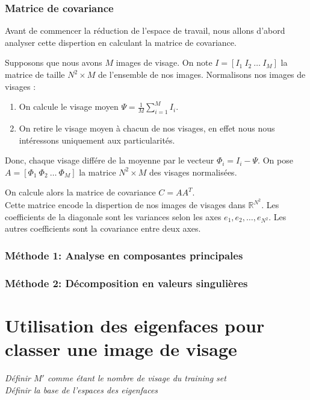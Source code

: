 \documentclass[12pt,french]{article}
\begin{document}
\subsubsection{Matrice de covariance}
Avant de commencer la réduction de l'espace de travail, nous allons d'abord analyser cette dispertion en calculant la matrice de covariance.

Supposons que nous avons $M$ images de visage. On note $I = [I_1~I_2~\dots~I_M]$ la matrice de taille $N^2 \times M$ de l'ensemble de nos images. Normalisons nos images de visages :
\begin{enumerate}
\item On calcule le visage moyen $\Psi = \frac{1}{M}\displaystyle\sum_{i=1}^{M} I_i$.
\item On retire le visage moyen à chacun de nos visages, en effet nous nous intéressons uniquement aux particularités.
\end{enumerate}
Donc, chaque visage différe de la moyenne par le vecteur $\Phi_i = I_i - \Psi$. On pose $A = [\Phi_1~\Phi_2~\dots~\Phi_M]$ la matrice $N^2 \times M$ des visages normalisées.

On calcule alors la matrice de covariance $C = AA^T$.\\
Cette matrice encode la dispertion de nos images de visages dans $\mathbb{R}^{N^2}$. Les coefficients de la diagonale sont les variances selon les axes $e_1, e_2, \dots, e_{N^2}$.
Les autres coefficients sont la covariance entre deux axes.

\subsubsection{Méthode 1: Analyse en composantes principales}
\subsubsection{Méthode 2: Décomposition en valeurs singulières}
\section{Utilisation des eigenfaces pour classer une image de visage}
\emph{Définir $M'$ comme étant le nombre de visage du training set}\\
\emph{Définir la base de l'espaces des eigenfaces}
\end{document}
